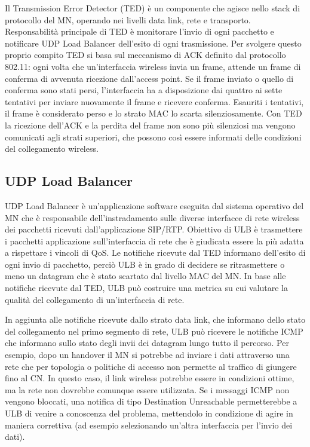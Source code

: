 \documentclass[12pt,a4paper,openright,twoside,draft]{book}
\begin{document}
Il Transmission Error Detector (TED) è un componente che agisce nello
stack di protocollo del MN, operando nei livelli data link, rete e
transporto. Responsabilità principale di TED è monitorare l'invio di
ogni pacchetto e notificare UDP Load Balancer dell'esito di ogni
trasmissione. Per svolgere questo proprio compito TED si basa sul
meccanismo di ACK definito dal protocollo 802.11: ogni volta che
un'interfaccia wireless invia un frame, attende un frame di conferma
di avvenuta ricezione dall'access point. Se il frame inviato o quello
di conferma sono stati persi, l'interfaccia ha a disposizione dai
quattro ai sette tentativi per inviare nuovamente il frame e ricevere
conferma. Esauriti i tentativi, il frame è considerato perso e lo
strato MAC lo scarta silenziosamente. Con TED la ricezione dell'ACK e
la perdita del frame non sono più silenziosi ma vengono comunicati
agli strati superiori, che possono così essere informati delle
condizioni del collegamento wireless.

\subsection{UDP Load Balancer}

UDP Load Balancer è un'applicazione software eseguita dal sistema
operativo del MN che è responsabile dell'instradamento sulle diverse
interfacce di rete wireless dei pacchetti ricevuti dall'applicazione
SIP/RTP. Obiettivo di ULB è trasmettere i pacchetti applicazione
sull'interfaccia di rete che è giudicata essere la più adatta a
rispettare i vincoli di QoS. Le notifiche ricevute dal TED informano
dell'esito di ogni invio di pacchetto, perciò ULB è in grado di
decidere se ritrasmettere o meno un datagram che è stato scartato dal
livello MAC del MN. In base alle notifiche ricevute dal TED, ULB può
costruire una metrica su cui valutare la qualità del collegamento di
un'interfaccia di rete.

In aggiunta alle notifiche ricevute dallo strato data link, che
informano dello stato del collegamento nel primo segmento di rete, ULB
può ricevere le notifiche ICMP che informano sullo stato degli invii
dei datagram lungo tutto il percorso. Per esempio, dopo un handover il
MN si potrebbe ad inviare i dati attraverso una rete che per topologia
o politiche di accesso non permette al traffico di giungere fino al
CN. In questo caso, il link wireless potrebbe essere in condizioni
ottime, ma la rete non dovrebbe comunque essere utilizzata. Se i
messaggi ICMP non vengono bloccati, una notifica di tipo Destination
Unreachable permetterebbe a ULB di venire a conoscenza del problema,
mettendolo in condizione di agire in maniera correttiva (ad esempio
selezionando un'altra interfaccia per l'invio dei dati).
\end{document}
